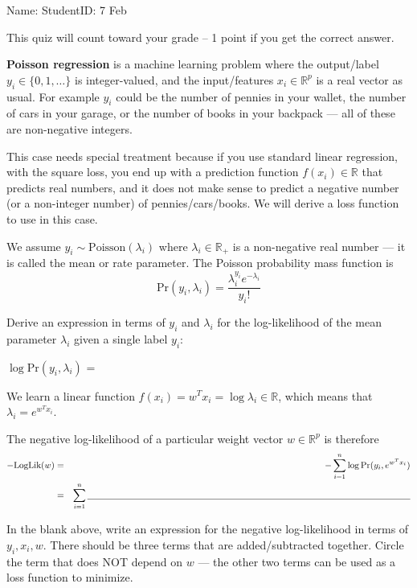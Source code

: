 \documentclass[12pt]{article}
\begin{document}
\thispagestyle{empty}

Name: \underline{\hspace{2in}} StudentID: \underline{\hspace{2in}} 7 Feb

This quiz will count toward your grade -- 1 point if you get the
correct answer.

\textbf{Poisson regression} is a  machine learning problem
where the output/label $y_i\in\{0,1, \dots \}$ is integer-valued, and
the input/features $x_i\in\mathbb R^p$ is a real vector as usual. For
example $y_i$ could be the number of pennies in your wallet, the
number of cars in your garage, or the number of books in your backpack
--- all of these are non-negative integers.

This case needs special treatment because if you use standard linear
regression, with the square loss, you end up with a prediction
function $f(x_i)\in\mathbb R$ that predicts real numbers, and it does
not make sense to predict a negative number (or a non-integer number)
of pennies/cars/books. We will derive a loss function to use in this case.

We assume $y_i\sim \text{Poisson}(\lambda_i)$ where
$\lambda_i\in\mathbb R_+$ is a non-negative real number --- it is
called the mean or rate parameter. The Poisson probability mass function is
\begin{equation*}
  \text{Pr}(y_i, \lambda_i) = \frac{\lambda_i^{y_i} e^{-\lambda_i}}{y_i!}
\end{equation*}

Derive an expression in terms of $y_i$ and $\lambda_i$ for the
log-likelihood of the mean parameter $\lambda_i$ given a single label
$y_i$: 

\vskip 1in

$\log\text{Pr}(y_i, \lambda_i)$ = \underline{\hspace{5in}}

We learn a linear function
$f(x_i)=w^T x_i = \log \lambda_i\in\mathbb R$, which means that
$\lambda_i = e^{w^T x_i}$. 

The negative log-likelihood of a particular weight vector
$w\in\mathbb R^p$ is therefore
\begin{eqnarray*}
  -\text{LogLik}(w) &=& - \sum_{i=1}^n \log\text{Pr}(y_i, e^{w^T x_i})\\
\vspace{ 1in}
  &=& \sum_{i=1}^n \underline{\hspace{5in}}
\end{eqnarray*}

In the blank above, write an expression for the negative log-likelihood in terms of $y_i,x_i,w$. There should be three terms that are
added/subtracted together. Circle the term that does NOT depend on $w$
--- the other two terms can be used as a loss function to minimize.
\end{document}
